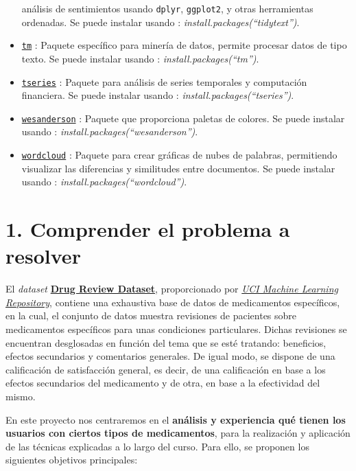 \documentclass[spanish,]{article}
\begin{document}
\begin{itemize}
  análisis de sentimientos usando \texttt{dplyr}, \texttt{ggplot2}, y
  otras herramientas ordenadas. Se puede instalar usando :
  \emph{install.packages(``tidytext'')}.
\item
  \href{https://cran.r-project.org/web/packages/tm/tm.pdf}{\texttt{tm}}
  : Paquete específico para minería de datos, permite procesar datos de
  tipo texto. Se puede instalar usando :
  \emph{install.packages(``tm'')}.
\item
  \href{https://cran.r-project.org/web/packages/tseries/tseries.pdf}{\texttt{tseries}}
  : Paquete para análisis de series temporales y computación financiera.
  Se puede instalar usando : \emph{install.packages(``tseries'')}.
\item
  \href{https://cran.r-project.org/web/packages/wesanderson/wesanderson.pdf}{\texttt{wesanderson}}
  : Paquete que proporciona paletas de colores. Se puede instalar usando
  : \emph{install.packages(``wesanderson'')}.
\item
  \href{https://cran.r-project.org/web/packages/wordcloud/wordcloud.pdf}{\texttt{wordcloud}}
  : Paquete para crear gráficas de nubes de palabras, permitiendo
  visualizar las diferencias y similitudes entre documentos. Se puede
  instalar usando : \emph{install.packages(``wordcloud'')}.
\end{itemize}

\newpage

\section{1. Comprender el problema a
resolver}\label{comprender-el-problema-a-resolver}

El \emph{dataset}
\href{https://archive.ics.uci.edu/ml/datasets/Drug+Review+Dataset+\%28Druglib.com\%29}{\textbf{Drug
Review Dataset}}, proporcionado por
\href{https://archive.ics.uci.edu/ml/index.php}{\emph{UCI Machine
Learning Repository}}, contiene una exhaustiva base de datos de
medicamentos específicos, en la cual, el conjunto de datos muestra
revisiones de pacientes sobre medicamentos específicos para unas
condiciones particulares. Dichas revisiones se encuentran desglosadas en
función del tema que se esté tratando: beneficios, efectos secundarios y
comentarios generales. De igual modo, se dispone de una calificación de
satisfacción general, es decir, de una calificación en base a los
efectos secundarios del medicamento y de otra, en base a la efectividad
del mismo.

En este proyecto nos centraremos en el \textbf{análisis y experiencia
qué tienen los usuarios con ciertos tipos de medicamentos}, para la
realización y aplicación de las técnicas explicadas a lo largo del
curso. Para ello, se proponen los siguientes objetivos principales:
\end{document}
